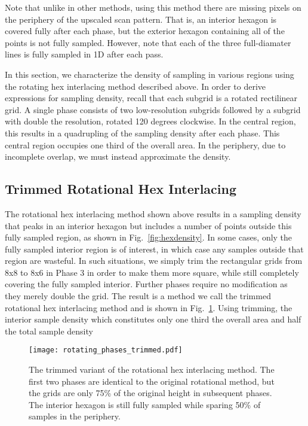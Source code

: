 \documentclass{article}
\newcommand{\reffig}[1]{Fig.~\ref{fig:#1}}
\begin{document}
Note that unlike in other methods, using this method there are missing pixels on the periphery of the upscaled scan pattern.
%
That is, an interior hexagon is covered fully after each phase, but the exterior hexagon containing all of the points is not fully sampled.
%
However, note that each of the three full-diamater lines is fully sampled in 1D after each pass.


In this section, we characterize the density of sampling in various regions using the rotating hex interlacing method described above.
%
In order to derive expressions for sampling density, recall that each subgrid is a rotated rectilinear grid.
%
A single phase consists of two low-resolution subgrids followed by a subgrid with double the resolution, rotated 120 degrees clockwise.
%
In the central region, this results in a quadrupling of the sampling density after each phase.
%
This central region occupies one third of the overall area.
%
In the periphery, due to incomplete overlap, we must instead approximate the density.

\subsection{Trimmed Rotational Hex Interlacing}
\label{sec:trimmed}

The rotational hex interlacing method shown above results in a sampling density that peaks in an interior hexagon but includes a number of points outside this fully sampled region, as shown in \reffig{hexdensity}.
%
In some cases, only the fully sampled interior region is of interest, in which case any samples outside that region are wasteful.
%
In such situations, we simply trim the rectangular grids from 8x8 to 8x6 in Phase 3 in order to make them more square, while still completely covering the fully sampled interior.
%
Further phases require no modification as they merely double the grid.
%
The result is a method we call the trimmed rotational hex interlacing method and is shown in \reffig{trimmedrotatingphases}.
%
Using trimming, the interior sample density which constitutes only one third the overall area and half the total sample density

\begin{figure}[ht]
\centering
\texttt{[image: rotating\_phases\_trimmed.pdf]}
\caption{
\label{fig:trimmedrotatingphases} 
The trimmed variant of the rotational hex interlacing method.
%
The first two phases are identical to the original rotational method, but the grids are only 75\% of the original height in subsequent phases.
%
The interior hexagon is still fully sampled while sparing 50\% of samples in the periphery.
}
\end{figure}
\end{document}
